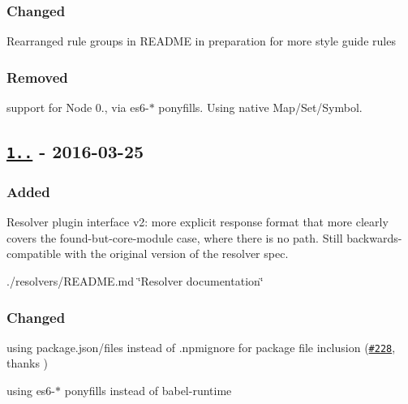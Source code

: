 \subsubsection*{Changed}


\begin{DoxyItemize}
\item Rearranged rule groups in R\+E\+A\+D\+ME in preparation for more style guide rules
\end{DoxyItemize}

\subsubsection*{Removed}


\begin{DoxyItemize}
\item support for Node 0., via {\ttfamily es6-\/$\ast$} ponyfills. Using native Map/\+Set/\+Symbol.
\end{DoxyItemize}

\subsection*{\href{https://github.com/benmosher/eslint-plugin-import/compare/v1.3.0...v1.4.0}{\tt 1..} -\/ 2016-\/03-\/25}

\subsubsection*{Added}


\begin{DoxyItemize}
\item Resolver plugin interface v2\+: more explicit response format that more clearly covers the found-\/but-\/core-\/module case, where there is no path. Still backwards-\/compatible with the original version of the resolver spec.
\item ./resolvers/\+R\+E\+A\+D\+ME.md \char`\"{}\+Resolver documentation\char`\"{}
\end{DoxyItemize}

\subsubsection*{Changed}


\begin{DoxyItemize}
\item using {\ttfamily package.\+json/files} instead of {\ttfamily .npmignore} for package file inclusion (\href{https://github.com/benmosher/eslint-plugin-import/pull/228}{\tt \#228}, thanks \href{https://github.com/mathieudutour}{\tt })
\item using {\ttfamily es6-\/$\ast$} ponyfills instead of {\ttfamily babel-\/runtime}
\end{DoxyItemize}

